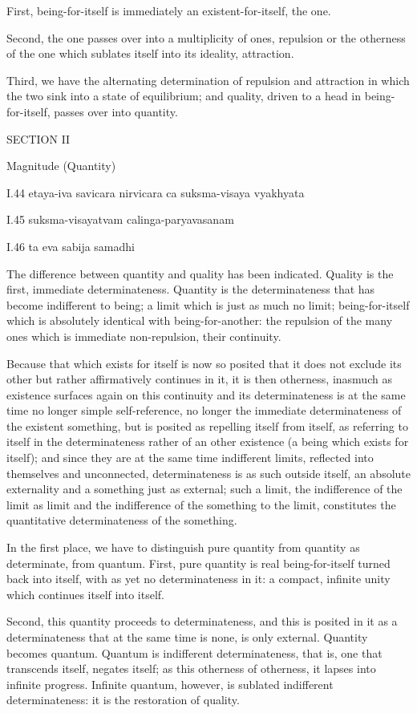 First, being-for-itself is immediately
an existent-for-itself, the one.

Second, the one passes over into a multiplicity of ones,
repulsion or the otherness of the one
which sublates itself into its ideality, attraction.

Third, we have the alternating
determination of repulsion and attraction
in which the two sink into a state of equilibrium;
and quality, driven to a head in being-for-itself,
passes over into quantity.

SECTION II

Magnitude (Quantity)

I.44
etaya-iva savicara nirvicara ca suksma-visaya vyakhyata

I.45
suksma-visayatvam calinga-paryavasanam

I.46
ta eva sabija samadhi

The difference between quantity and quality has been indicated.
Quality is the first, immediate determinateness.
Quantity is the determinateness that
has become indifferent to being;
a limit which is just as much no limit;
being-for-itself which is absolutely
identical with being-for-another:
the repulsion of the many ones
which is immediate non-repulsion,
their continuity.

Because that which exists for itself is now so posited
that it does not exclude its other
but rather affirmatively continues in it,
it is then otherness, inasmuch as
existence surfaces again on this continuity
and its determinateness is at the same time
no longer simple self-reference,
no longer the immediate determinateness
of the existent something,
but is posited as repelling itself from itself,
as referring to itself in the determinateness
rather of an other existence
(a being which exists for itself);
and since they are at the same time indifferent limits,
reflected into themselves and unconnected,
determinateness is as such outside itself,
an absolute externality and a something just as external;
such a limit, the indifference of the limit as limit
and the indifference of the something to the limit,
constitutes the quantitative determinateness of the something.

In the first place, we have to distinguish pure quantity
from quantity as determinate, from quantum.
First, pure quantity is real being-for-itself
turned back into itself, with as yet no determinateness in it:
a compact, infinite unity which continues itself into itself.

Second, this quantity proceeds to determinateness,
and this is posited in it as a determinateness
that at the same time is none, is only external.
Quantity becomes quantum.
Quantum is indifferent determinateness,
that is, one that transcends itself, negates itself;
as this otherness of otherness, it lapses into infinite progress.
Infinite quantum, however, is sublated indifferent determinateness:
it is the restoration of quality.

